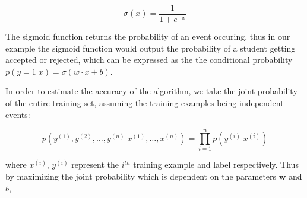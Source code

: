 $$
\sigma(x) = \frac{1}{1 + e^{-x}}
$$

The sigmoid function returns the probability of an event occuring, thus in our example the sigmoid function would output the probability of a student getting accepted or rejected, which can be expressed as the the conditional probability $p(y=1 | x) = \sigma(w\cdot x + b)$.

In order to estimate the accuracy of the algorithm, we take the joint probability of the entire training set, assuming the training examples being independent events:

\begin{equation}
  \label{equ:likelihood}
  p(y^{(1)}, y^{(2)}, \ldots, y^{(n)} | x^{(1)}, \ldots, x^{(n)}) = \prod_{i=1}^{n} p(y^{(i)}|x^{(i)})
\end{equation}

where $x^{(i)}$, $y^{(i)}$ represent the $i^{th}$ training example and label respectively. Thus by maximizing the joint probability which is dependent on the parameters $\textbf{w}$ and $b$, 
